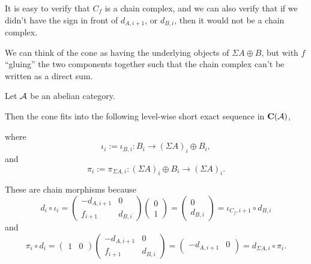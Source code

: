 It is easy to verify that \( C_f \) is a chain complex, and we can also verify that if we didn't have the sign in front of \( d_{A, i + 1} \), or  \( d_{B, i} \), then it would not be a chain complex.

We can think of the cone as having the underlying objects of \( \Sigma A \oplus B \), but with \( f \) ``gluing'' the two components together such that the chain complex can't be written as a direct sum.

\begin{remark}
    Let \( {\mathcal{A}} \) be an abelian category.

    Then the cone fits into the following level-wise short exact sequence in \( \operatorname{\mathbf{C}}({\mathcal{A}}) \),
    \begin{center}
    \end{center}
    where
    \[
        \iota_i := \iota_{B, i}: B_i \to (\Sigma A)_i \oplus B_i,
    \]
    and
    \[
        \pi_i := \pi_{\Sigma A, i}: (\Sigma A)_i \oplus B_i \to (\Sigma A)_i.
    \]

    These are chain morphisms because
    \[
        d_i \circ \iota_i =
        \begin{pmatrix}
            -d_{A, i + 1} & 0 \\
            f_{i + 1} & d_{B, i}
        \end{pmatrix}
        \begin{pmatrix}
            0 \\
            1
        \end{pmatrix}
        =
        \begin{pmatrix}
            0 \\
            d_{B, i}
        \end{pmatrix}
        =
        \iota_{C_f, i + 1} \circ d_{B, i}
    \]
    and
    \[
        \pi_i \circ d_i =
        \begin{pmatrix}
            1 & 0
        \end{pmatrix}
        \begin{pmatrix}
            -d_{A, i + 1} & 0 \\
            f_{i + 1} & d_{B, i}
        \end{pmatrix}
        =
        \begin{pmatrix}
            -d_{A, i + 1} & 0
        \end{pmatrix}
        = d_{\Sigma A, i} \circ \pi_i.
    \]
\end{remark}

